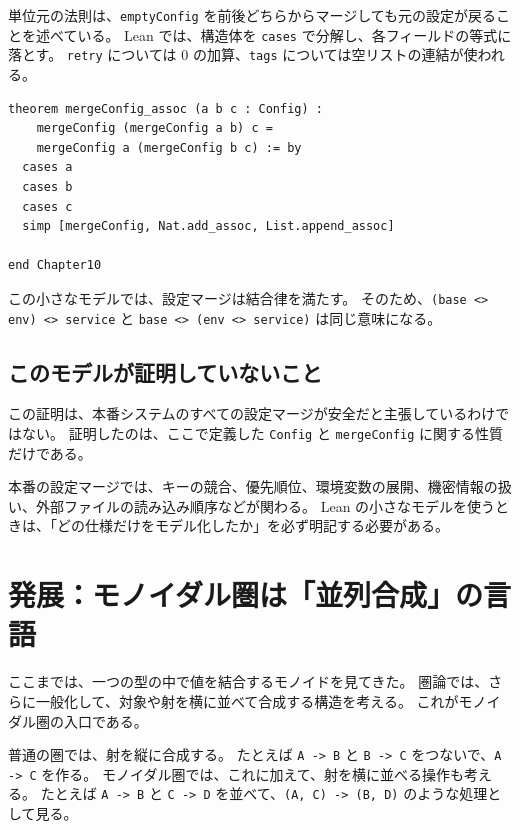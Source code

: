 単位元の法則は、\texttt{emptyConfig} を前後どちらからマージしても元の設定が戻ることを述べている。
Lean では、構造体を \texttt{cases} で分解し、各フィールドの等式に落とす。
\texttt{retry} については \(0\) の加算、\texttt{tags} については空リストの連結が使われる。

\begin{listing}[htbp]
\begin{verbatim}
theorem mergeConfig_assoc (a b c : Config) :
    mergeConfig (mergeConfig a b) c =
    mergeConfig a (mergeConfig b c) := by
  cases a
  cases b
  cases c
  simp [mergeConfig, Nat.add_assoc, List.append_assoc]

end Chapter10
\end{verbatim}
\caption{設定マージの結合律}
\label{lst:ch10_config_assoc}
\end{listing}

この小さなモデルでは、設定マージは結合律を満たす。
そのため、\texttt{(base <> env) <> service} と \texttt{base <> (env <> service)} は同じ意味になる。


\subsection{このモデルが証明していないこと}

この証明は、本番システムのすべての設定マージが安全だと主張しているわけではない。
証明したのは、ここで定義した \texttt{Config} と \texttt{mergeConfig} に関する性質だけである。

\begin{warningbox}
本番の設定マージでは、キーの競合、優先順位、環境変数の展開、機密情報の扱い、外部ファイルの読み込み順序などが関わる。
Lean の小さなモデルを使うときは、「どの仕様だけをモデル化したか」を必ず明記する必要がある。
\end{warningbox}

\section{発展：モノイダル圏は「並列合成」の言語}

ここまでは、一つの型の中で値を結合するモノイドを見てきた。
圏論では、さらに一般化して、対象や射を横に並べて合成する構造を考える。
これがモノイダル圏の入口である。

\begin{intuitionbox}
普通の圏では、射を縦に合成する。
たとえば \texttt{A -> B} と \texttt{B -> C} をつないで、\texttt{A -> C} を作る。
モノイダル圏では、これに加えて、射を横に並べる操作も考える。
たとえば \texttt{A -> B} と \texttt{C -> D} を並べて、\texttt{(A, C) -> (B, D)} のような処理として見る。
\end{intuitionbox}

